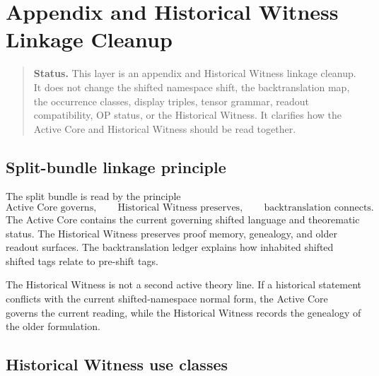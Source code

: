 \clearpage
\section{ Appendix and Historical Witness Linkage Cleanup}
\label{sec:v405-appendix-historical-witness-linkage-cleanup}

\begin{quote}\small
\noindent\textbf{Status.}
This  layer is an appendix and Historical Witness linkage cleanup. It
does not change the shifted namespace shift, the backtranslation map, the occurrence
classes, display triples, tensor grammar, readout compatibility, OP status, or
the Historical Witness. It clarifies how the Active Core and Historical
Witness should be read together.
\end{quote}

\subsection{Split-bundle linkage principle}
\label{subsec:v405-split-bundle-linkage-principle}

\begin{definition}
\label{def:v405-split-bundle-linkage-principle}
The split bundle is read by the principle
\[
 \text{Active Core governs},\qquad
 \text{Historical Witness preserves},\qquad
 \text{backtranslation connects}.
\]
The Active Core contains the current governing shifted language and theorematic
status. The Historical Witness preserves proof memory, genealogy, and older
readout surfaces. The backtranslation ledger explains how inhabited shifted
shifted tags relate to pre-shift tags.
\end{definition}

\begin{remark}
\label{rem:v405-no-second-active-theory-line}
The Historical Witness is not a second active theory line. If a historical
statement conflicts with the current shifted-namespace normal form, the Active Core governs
the current reading, while the Historical Witness records the genealogy of the
older formulation.
\end{remark}

\subsection{Historical Witness use classes}
\label{subsec:v405-historical-witness-use-classes}

